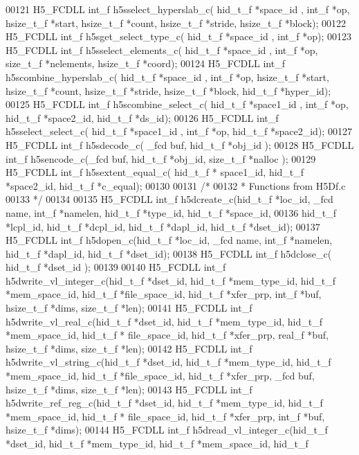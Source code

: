 \begin{DoxyCode}
00121 H5\_FCDLL int\_f h5sselect\_hyperslab\_c( hid\_t\_f *space\_id , int\_f *op, hsize\_t\_f *start, hsize\_t\_f *count, 
      hsize\_t\_f *stride, hsize\_t\_f *block);
00122 H5\_FCDLL int\_f h5sget\_select\_type\_c( hid\_t\_f *space\_id , int\_f *op);
00123 H5\_FCDLL int\_f h5sselect\_elements\_c( hid\_t\_f *space\_id , int\_f *op, size\_t\_f *nelements, hsize\_t\_f *coord);
00124 H5\_FCDLL int\_f h5scombine\_hyperslab\_c( hid\_t\_f *space\_id , int\_f *op, hsize\_t\_f *start, hsize\_t\_f *count, 
      hsize\_t\_f *stride, hsize\_t\_f *block, hid\_t\_f *hyper\_id);
00125 H5\_FCDLL int\_f h5scombine\_select\_c( hid\_t\_f *space1\_id , int\_f *op, hid\_t\_f *space2\_id, hid\_t\_f *ds\_id);
00126 H5\_FCDLL int\_f h5sselect\_select\_c( hid\_t\_f *space1\_id , int\_f *op, hid\_t\_f *space2\_id);
00127 H5\_FCDLL int\_f h5sdecode\_c( \_fcd buf, hid\_t\_f *obj\_id );
00128 H5\_FCDLL int\_f h5sencode\_c(\_fcd buf, hid\_t\_f *obj\_id, size\_t\_f *nalloc );
00129 H5\_FCDLL int\_f h5sextent\_equal\_c( hid\_t\_f * space1\_id, hid\_t\_f *space2\_id, hid\_t\_f *c\_equal);
00130 
00131 \textcolor{comment}{/*}
00132 \textcolor{comment}{ * Functions from H5Df.c}
00133 \textcolor{comment}{ */}
00134 
00135 H5\_FCDLL int\_f h5dcreate\_c(hid\_t\_f *loc\_id, \_fcd name, int\_f *namelen, hid\_t\_f *type\_id, hid\_t\_f *space\_id,
00136                  hid\_t\_f *lcpl\_id, hid\_t\_f *dcpl\_id, hid\_t\_f *dapl\_id, hid\_t\_f *dset\_id);
00137 H5\_FCDLL int\_f h5dopen\_c(hid\_t\_f *loc\_id, \_fcd name, int\_f *namelen, hid\_t\_f *dapl\_id, hid\_t\_f *dset\_id);
00138 H5\_FCDLL int\_f h5dclose\_c( hid\_t\_f *dset\_id );
00139 
00140 H5\_FCDLL int\_f h5dwrite\_vl\_integer\_c(hid\_t\_f *dset\_id, hid\_t\_f *mem\_type\_id, hid\_t\_f *mem\_space\_id, hid\_t\_f
       *file\_space\_id, hid\_t\_f *xfer\_prp, int\_f *buf, hsize\_t\_f *dims, size\_t\_f *len);
00141 H5\_FCDLL int\_f h5dwrite\_vl\_real\_c(hid\_t\_f *dset\_id, hid\_t\_f *mem\_type\_id, hid\_t\_f *mem\_space\_id, hid\_t\_f *
      file\_space\_id, hid\_t\_f *xfer\_prp, real\_f *buf, hsize\_t\_f *dims, size\_t\_f *len);
00142 H5\_FCDLL int\_f h5dwrite\_vl\_string\_c(hid\_t\_f *dset\_id, hid\_t\_f *mem\_type\_id, hid\_t\_f *mem\_space\_id, hid\_t\_f 
      *file\_space\_id, hid\_t\_f *xfer\_prp, \_fcd buf, hsize\_t\_f *dims, size\_t\_f *len);
00143 H5\_FCDLL int\_f h5dwrite\_ref\_reg\_c(hid\_t\_f *dset\_id, hid\_t\_f *mem\_type\_id, hid\_t\_f *mem\_space\_id, hid\_t\_f *
      file\_space\_id, hid\_t\_f *xfer\_prp, int\_f *buf, hsize\_t\_f *dims);
00144 H5\_FCDLL int\_f h5dread\_vl\_integer\_c(hid\_t\_f *dset\_id, hid\_t\_f *mem\_type\_id, hid\_t\_f *mem\_space\_id, hid\_t\_f 

\end{DoxyCode}
